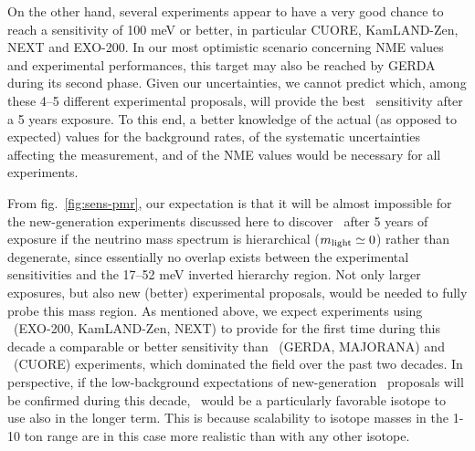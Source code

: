 On the other hand, several experiments appear to have a very good chance to reach a sensitivity of 100 meV or better, in particular CUORE, KamLAND-Zen, NEXT and EXO-200. In our most optimistic scenario concerning NME values and experimental performances, this target may also be reached by GERDA during its second phase. Given our uncertainties, we cannot predict which, among these 4--5 different experimental proposals, will provide the best \mbb\ sensitivity after a 5 years exposure. To this end, a better knowledge of the actual (as opposed to expected) values for the background rates, of the systematic uncertainties affecting the measurement, and of the NME values would be necessary for all experiments.

From fig.~\ref{fig:sens-pmr}, our expectation is that it will be almost impossible for the new-generation experiments discussed here to discover \bbonu\ after 5 years of exposure if the neutrino mass spectrum is hierarchical ($m_{\rm light}\simeq 0$) rather than degenerate, since essentially no overlap exists between the experimental sensitivities and the 17--52 meV inverted hierarchy region. Not only larger exposures, but also new (better) experimental proposals, would be needed to fully probe this mass region. As mentioned above, we expect experiments using \XE\ (EXO-200, KamLAND-Zen, NEXT) to provide for the first time during this decade a comparable or better sensitivity than \GE\ (GERDA, MAJORANA) and \TE\ (CUORE) experiments, which dominated the field over the past two decades. In perspective, if the low-background expectations of new-generation \XE\ proposals will be confirmed during this decade, \XE\ would be a particularly favorable isotope to use also in the longer term. This is because scalability to isotope masses in the 1-10 ton range are in this case more realistic than with any other isotope. 

